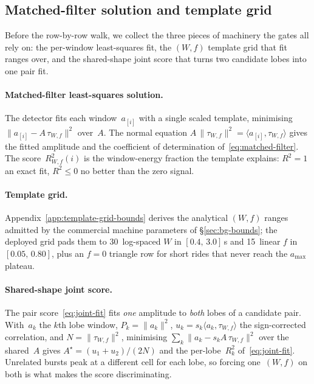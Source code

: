 \documentclass[manuscript,review,screen]{acmart}
\begin{document}
\subsection{Matched-filter solution and template grid}
\label{app:seg-matched-filter}

Before the row-by-row walk, we collect the three pieces of machinery
the gates all rely on: the per-window least-squares fit, the
$(W,f)$ template grid that fit ranges over, and the shared-shape
joint score that turns two candidate lobes into one pair fit.

\paragraph{Matched-filter least-squares solution.}
The detector fits each window~$a_{[i]}$ with a single scaled template,
minimising $\|a_{[i]}-A\,\tau_{W,f}\|^{2}$ over~$A$.  The normal
equation $A\,\|\tau_{W,f}\|^{2}=\langle a_{[i]},\tau_{W,f}\rangle$
gives the fitted amplitude and the coefficient of determination
of~\eqref{eq:matched-filter}.  The score~$R^{2}_{W,f}(i)$ is the
window-energy fraction the template explains: $R^{2}\!=\!1$ an exact
fit, $R^{2}\!\le\!0$ no better than the zero signal.

\paragraph{Template grid.}
Appendix~\ref{app:template-grid-bounds} derives the analytical
$(W,f)$ ranges admitted by the commercial machine parameters of
\S\ref{sec:bg-bounds}; the deployed grid pads them to 30~log-spaced
$W$ in $[0.4,\,3.0]$\,s and 15~linear $f$ in $[0.05,\,0.80]$, plus
an $f\!=\!0$ triangle row for short rides that never reach the
$a_{\max}$ plateau.

\paragraph{Shared-shape joint score.}
The pair score~\eqref{eq:joint-fit} fits \emph{one} amplitude to
\emph{both} lobes of a candidate pair.  With~$a_k$ the $k$th lobe
window, $P_k=\|a_k\|^{2}$, $u_k=s_k\langle a_k,\tau_{W,f}\rangle$ the
sign-corrected correlation, and $N=\|\tau_{W,f}\|^{2}$, minimising
$\sum_k\|a_k-s_k A\,\tau_{W,f}\|^{2}$ over the shared~$A$ gives
$A^{\star}=(u_1+u_2)/(2N)$ and the per-lobe~$R^{2}_k$
of~\eqref{eq:joint-fit}.  Unrelated bursts peak at a different cell
for each lobe, so forcing one~$(W,f)$ on both is what makes the score
discriminating.
\end{document}
